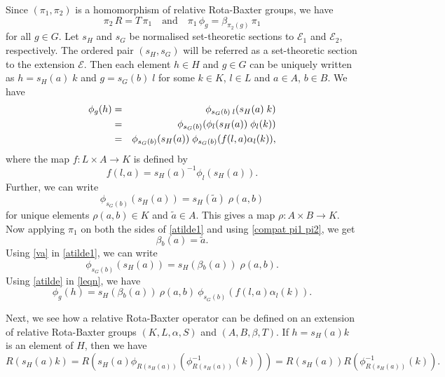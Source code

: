 \documentclass[11pt]{amsart}
\theoremstyle{thrm}
\theoremstyle{plain}
\theoremstyle{definition}
\numberwithin{equation}{section}
\begin{document}
Since $(\pi_1, \pi_2)$ is a homomorphism of relative Rota-Baxter groups, we have 
\begin{equation}\label{compat pi1 pi2}
\pi_2 \,R= T \, \pi_1 \quad \textrm{and} \quad \pi_1\, \phi_g= \beta_{\pi_2(g)} \,\pi_1
\end{equation}
for all $g \in G$. Let $s_{H}$ and $s_{G}$ be normalised set-theoretic sections to $\mathcal{E}_1 $ and $\mathcal{E}_2$, respectively. The ordered pair $(s_H, s_G)$ will be referred as a set-theoretic section to the extension $\mathcal{E}$. Then each element $h \in H$ and $g \in G$ can be uniquely written as  $h= s_H(a)\; k$ and $g=s_G(b) \; l$ for some $k \in K$, $l \in L$ and $a \in A$, $b \in B$. We have 
\begin{eqnarray}\label{leqn}
	\phi_g(h) &= & \phi_{ s_G(b) \; l}( s_H(a) \; k) \notag \\
&= & \phi_{ s_G(b)}( \phi_l(s_H(a)) \; \phi_l (k))  \notag  \\
	&= &   \phi_{ s_G(b)}( s_H(a)) \;   \phi_{s_G(b)} (f(l,a) \alpha_l(k)),
\end{eqnarray}
where the map $f: L \times A \longrightarrow K$ is defined by
\begin{equation}\label{fdefn}
 f(l,a)= s_H( a)^{-1} \phi_l(s_H(a)) .
\end{equation}
 Further, we can write 
\begin{equation}\label{atilde1}
	\phi_{s_G(b)}(s_H(a)) =   s_H(\tilde{a}) \;\rho(a, b) 
\end{equation}
for unique elements  $\rho(a, b) \in K$ and $\tilde{a} \in A$. This gives a map $\rho: A \times B \longrightarrow K$. Now applying $\pi_1$ on both the sides of \eqref{atilde1} and using \eqref{compat pi1 pi2}, we get 
\begin{equation}\label{va}
	\beta{_b(a)}=  \tilde{a}.
\end{equation}
Using \eqref{va} in \eqref{atilde1}, we can write
\begin{equation}\label{atilde}
	\phi_{s_G(b)}(s_H(a)) =   s_H(\beta{_b(a)}) \; \rho(a, b).
\end{equation}
Using \eqref{atilde} in \eqref{leqn}, we have 
\begin{equation}\label{feqn}
	\phi_g(h)=   s_H(\beta{_b(a)})~ \rho(a,b)  ~ \phi_{s_G(b)} (f(l,a)\alpha_l(k)) .
\end{equation}
\par 

Next, we see how a relative Rota-Baxter operator can be defined on an extension of relative Rota-Baxter groups  $(K,L, \alpha,S )$ and $(A,B, \beta, T)$. If $h=s_H(a) k$ is an element of $H$, then we have  
\begin{equation}\label{RRB1}
 R( s_H(a) k  ) 	= R(s_H(a) \phi_{R(s_H(a))}(\phi^{-1}_{R(s_H(a))}(k)) )=  R(s_H(a)) R(\phi^{-1}_{R(s_H(a))}(k)).
\end{equation}
\end{document}

